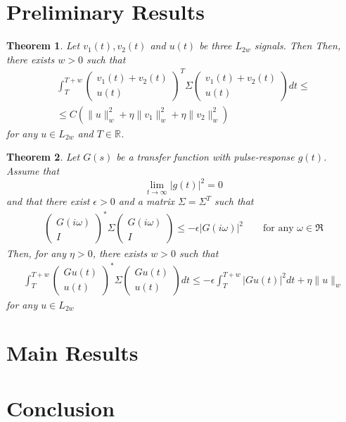 \documentclass[letterpaper,10pt,conference,twocolumn]{IEEEtran}
\newtheorem{thm}{Theorem}[section]
\newcommand{\eps}{\epsilon}
\newcommand{\w}{\omega}
\newcommand{\Real}{\mathbb{R}}
\begin{document}
\section{Preliminary Results}\label{sec:prelim}

\begin{thm}
	Let $v_1(t), v_2(t)$ and $u(t)$ be three $L_{2w}$ signals. Then
	Then, there exists $w>0$ such that
	\begin{align}
		\int_{T}^{T+w}
			\left(\begin{array}{c}
				v_1(t)+v_2(t)\\ u(t)
			\end{array}\right)^T
			\Sigma
			\left(\begin{array}{c}
				v_1(t)+v_2(t)\\ u(t)
			\end{array}\right)
		dt
		\leq\\
		\leq C (\|u\|_w^2 + \eta\|v_1\|_w^2 + \eta\|v_2\|_w^2) 
	\end{align}
	for any $u\in L_{2w}$ and $T\in\Real$.
\end{thm}


\begin{thm}
	Let $G(s)$ be a transfer function with pulse-response $g(t)$.
	Assume that
	\begin{equation}
		\lim_{t\rightarrow \infty}|g(t)|^2=0
	\end{equation}
	and that there exist $\eps>0$ and a matrix $\Sigma=\Sigma^T$ such that
	\begin{align}
		\left(\begin{array}{c}
			G(i\w)\\ I
		\end{array}\right)^*
		\Sigma
		\left(\begin{array}{c}
			G(i\w)\\ I
		\end{array}\right)
		\leq -\eps |G(i\w)|^2
		\qquad \text{for any } \w\in\Re
	\end{align}
	Then, for any $\eta>0$, there exists $w>0$ such that
	\begin{align}
		\int_{T}^{T+w}
			\left(\begin{array}{c}
				Gu(t)\\ u(t)
			\end{array}\right)^*
			\Sigma
			\left(\begin{array}{c}
				Gu(t)\\ u(t)
			\end{array}\right)
		dt
		\leq
		-\eps \int_{T}^{T+w}
			|Gu(t)|^2 dt + \eta\|u\|_w
	\end{align}
	for any $u\in L_{2w}$
\end{thm}


\section{Main Results}\label{sec:main}

\section{Conclusion}
\end{document}
